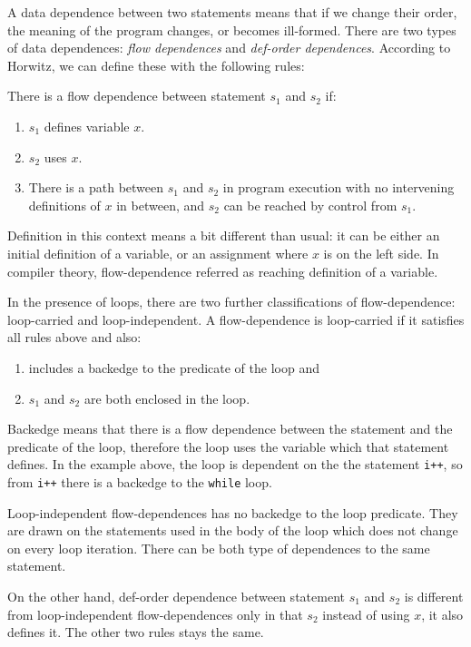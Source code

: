 \documentclass[oneside,12pt,a4paper]{book}
\begin{document}
A data dependence between two statements means that if we change their order, the meaning of the program changes, or becomes ill-formed. There are two types of data dependences: \textit{flow dependences} and \textit{def-order dependences}. According to Horwitz\cite{horwitz-interproc}, we can define these with the following rules:

There is a flow dependence between statement $s_1$ and $s_2$ if:
\begin{enumerate}
  \item $s_1$ defines variable $x$.
  \item $s_2$ uses $x$.
  \item There is a path between $s_1$ and $s_2$ in program execution with no intervening definitions of $x$ in between, and $s_2$ can be reached by control from $s_1$. 
\end{enumerate}

Definition in this context means a bit different than usual: it can be either an initial definition of a variable, or an assignment where $x$ is on the left side. In compiler theory, flow-dependence referred as reaching definition of a variable.

In the presence of loops, there are two further classifications of flow-dependence: loop-carried and loop-independent. A flow-dependence is loop-carried if it satisfies all rules above and also:
\begin{enumerate}
  \item includes a backedge to the predicate of the loop and
  \item $s_1$ and $s_2$ are both enclosed in the loop.
\end{enumerate}

Backedge means that there is a flow dependence between the statement and the predicate of the loop, therefore the loop uses the variable which that statement defines. In the example above, the loop is dependent on the the statement \texttt{i++}, so from \texttt{i++} there is a backedge to the \texttt{while} loop.

Loop-independent flow-dependences has no backedge to the loop predicate. They are drawn on the statements used in the body of the loop which does not change on every loop iteration. There can be both type of dependences to the same statement. 

On the other hand, def-order dependence between statement $s_1$ and $s_2$ is different from loop-independent flow-dependences only in that $s_2$ instead of using $x$, it also defines it. The other two rules stays the same. 
\end{document}

